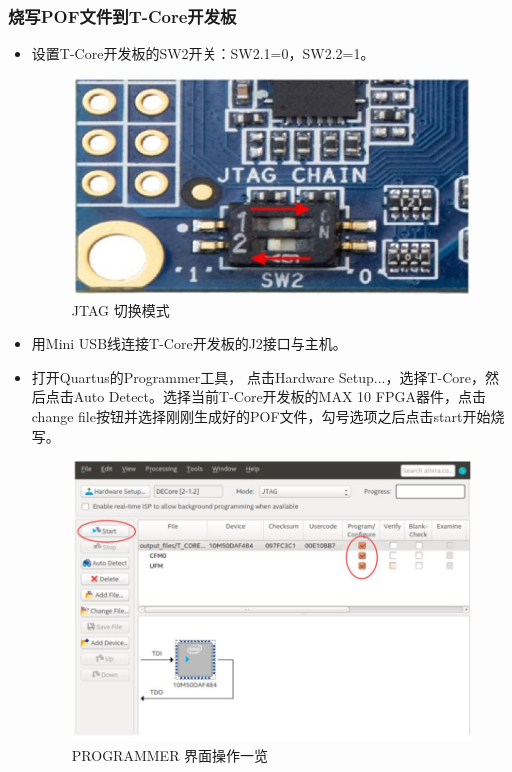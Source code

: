 \documentclass[a4paper, 14pt, oneside]{book} %
\numberwithin{equation}{subsection}
\begin{document}
	\subsubsection{烧写POF文件到T-Core开发板}
	\begin{itemize}
		\item 设置T-Core开发板的SW2开关：SW2.1=0，SW2.2=1。
		\begin{figure}[H]
			\centering
			\includegraphics[scale=0.7]{img/jtag.jpg}
			\caption{JTAG 切换模式}
		\end{figure}
		\item 用Mini USB线连接T-Core开发板的J2接口与主机。
		\item 打开Quartus的Programmer工具， 点击Hardware Setup...，选择T-Core，然后点击Auto Detect。选择当前T-Core开发板的MAX 10 FPGA器件，点击change file按钮并选择刚刚生成好的POF文件，勾号选项之后点击start开始烧写。
		\begin{figure}[H]
			\centering
			\includegraphics[scale=0.7]{img/pof.jpg}
			\caption{PROGRAMMER 界面操作一览}
		\end{figure}
		
	\end{itemize}	
\end{document}
